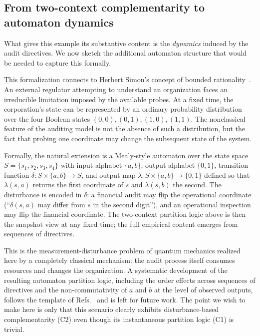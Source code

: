 \documentclass{article}
\begin{document}
\subsection{From two-context complementarity to automaton dynamics}
\label{sec:org-automaton}

What gives this example its substantive content is the
\emph{dynamics} induced by the audit directives. We now sketch the
additional automaton structure that would be needed to capture this
formally.

This formalization connects to Herbert Simon's concept of bounded
rationality~\cite{Simon1957}. An external regulator attempting to
understand an organization faces an irreducible limitation imposed by
the available probes. At a fixed time, the corporation's state can be
represented by an ordinary probability distribution over the four
Boolean states $(0,0),(0,1),(1,0),(1,1)$. The nonclassical feature of
the auditing model is not the absence of such a distribution, but the
fact that probing one coordinate may change the subsequent state of
the system.

Formally, the natural extension is a Mealy-style automaton over the
state space $S=\{s_1,s_2,s_3,s_4\}$ with input alphabet $\{a,b\}$,
output alphabet $\{0,1\}$, transition function $\delta\colon S\times
\{a,b\}\to S$, and output map $\lambda\colon S\times\{a,b\}\to\{0,1\}$
defined so that $\lambda(s,a)$ returns the first coordinate of $s$
and $\lambda(s,b)$ the second. The disturbance is encoded in
$\delta$: a financial audit may flip the operational coordinate
(``$\delta(s,a)$ may differ from $s$ in the second digit''), and an
operational inspection may flip the financial coordinate. The
two-context partition logic above is then the snapshot view at any
fixed time; the full empirical content emerges from sequences of
directives.

This is the measurement-disturbance problem of quantum mechanics
realized here by a completely classical mechanism: the audit process
itself consumes resources and changes the organization. A systematic
development of the resulting automaton partition logic, including
the order effects across sequences of directives and the
non-commutativity of $a$ and $b$ at the level of observed outputs,
follows the template of Refs.~\cite{schaller-92,svozil-2001-eua} and
is left for future work. The point we wish to make here is only that
this scenario clearly exhibits disturbance-based complementarity (C2)
even though its instantaneous partition logic (C1) is trivial.
\end{document}
